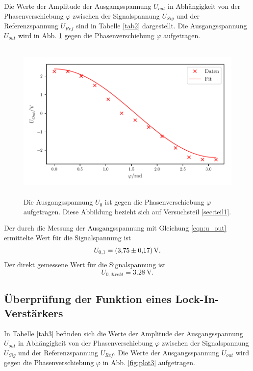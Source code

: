 \noindent Die Werte der Amplitude der Ausgangsspannung $U_{out}$ in Abhängigkeit von der Phasenverschiebung $\varphi$
zwischen der Signalspannung $U_{Sig}$ und der Referenzspannung $U_{Ref}$
sind in Tabelle \ref{tab2} dargestellt. Die Ausgangsspannung $U_{out}$ wird in Abb. \ref{fig:plot2} gegen die Phasenverschiebung $\varphi$
aufgetragen.


\begin{figure}
    \centering
    \includegraphics[width=12cm, height=8cm]{build/plot2.pdf}
    \caption{Die Ausgangsspannung $U_{0}$ ist gegen die Phasenverschiebung $\varphi$ aufgetragen.
    Diese Abbildung bezieht sich auf Versuchsteil \ref{sec:teil1}.}
    \label{fig:plot2}
\end{figure}

\noindent Der durch die Messung der Ausgangsspannung mit Gleichung \eqref{eqn:u_out} ermittelte Wert für die Signalspannung ist
\begin{equation*}
    U_{0,1} = \SI{3.75 \pm 0.17}{\volt}.
\end{equation*}
Der direkt gemessene Wert für die Signalspannung ist
\begin{equation*}
    U_{0,direkt} = \SI{3.28}{\volt}. %
\end{equation*}

\subsection{Überprüfung der Funktion eines Lock-In-Verstärkers}
\label{sec:teil2}
In Tabelle \ref{tab3} befinden sich die Werte der Amplitude der Ausgangsspannung $U_{out}$ in
Abhängigkeit von der Phasenverschiebung $\varphi$ zwischen der Signalspannung $U_{Sig}$ und
der Referenzspannung $U_{Ref}$. Die Werte der Ausgangsspannung $U_{out}$ wird gegen die Phasenverschiebung $\varphi$
in Abb. \ref{fig:plot3} aufgetragen.


